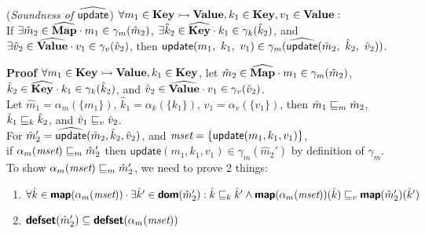 \begin{thm} \normalfont
(\textit{Soundness of} $\widehat{\textsf{update}}$) 
$\forall m_1 \in \textbf{Key} \rightarrowtail \textbf{Value}, k_1 \in \textbf{Key}, v_1 \in \textbf{Value} :$\\
If $\exists \hat{m}_2 \in \widehat{\textbf{Map}} \cdot m_1 \in \gamma_m(\hat{m}_2)$,
$\exists \hat{k}_2 \in \widehat{\textbf{Key}} \cdot k_1 \in \gamma_k(\hat{k}_2)$,
and $\exists \hat{v}_2 \in \widehat{\textbf{Value}} \cdot v_1 \in \gamma_v(\hat{v}_2)$,
then $\textsf{update}(m_1,\ k_1,\ v_1) \in \gamma_m(\widehat{\textsf{update}}(\hat{m}_2,\ \hat{k}_2,\ \hat{v}_2))$.
\end{thm}
\textbf{Proof } $\forall m_1 \in \textbf{Key} \rightarrowtail \textbf{Value}, k_1 \in \textbf{Key}$, 
let $\hat{m}_2 \in \widehat{\textbf{Map}} \cdot m_1 \in \gamma_m(\hat{m}_2)$,
$\hat{k}_2 \in \widehat{\textbf{Key}} \cdot k_1 \in \gamma_k(\hat{k}_2)$,
and $\hat{v}_2 \in \widehat{\textbf{Value}} \cdot v_1 \in \gamma_v(\hat{v}_2)$.\\
Let $\hat{m}_1 = \alpha_m(\{ m_1 \})$,
$\hat{k}_1 = \alpha_k(\{ k_1 \})$,
$\hat{v}_1 = \alpha_v(\{ v_1 \})$,
then $\hat{m}_1 \sqsubseteq_m \hat{m}_2$,
$\hat{k}_1 \sqsubseteq_k \hat{k}_2$,
and $\hat{v}_1 \sqsubseteq_v \hat{v}_2$.\\
For $\hat{m}_2' = \widehat{\textsf{update}}(\hat{m}_2, \hat{k}_2, \hat{v}_2)$,
and $\emph{mset} = \{ \textsf{update}(m_1, k_1, v_1) \}$, \\
if $\alpha_m(\emph{mset}) \sqsubseteq_m \hat{m}_2'$
then $\textsf{update}(m_1, k_1, v_1) \in \gamma_m(\hat{m}_2')$
by definition of $\gamma_m$.\\
To show $\alpha_m(\emph{mset}) \sqsubseteq_m \hat{m}_2'$, we need to prove 2 things:
\begin{enumerate}[label=({\arabic*})]
\item $\forall \hat{k} \in \textsf{\textbf{map}}(\alpha_m(\emph{mset})) \cdot
\exists \hat{k}' \in \textsf{\textbf{dom}}(\hat{m}_2'):
\hat{k} \sqsubseteq_k \hat{k}' \land \textsf{\textbf{map}}(\alpha_m(\emph{mset}))(\hat{k}) \sqsubseteq_v \textsf{\textbf{map}}(\hat{m}_2')(\hat{k}')$
\item $\textsf{\textbf{defset}}(\hat{m}_2') \subseteq \textsf{\textbf{defset}}(\alpha_m(\emph{mset}))$
\end{enumerate}
